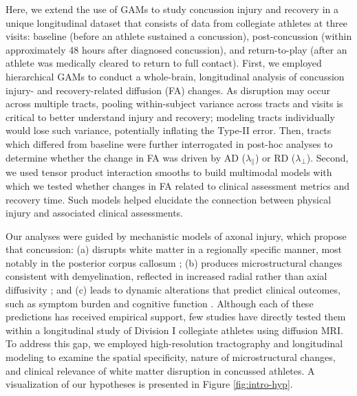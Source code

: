 \documentclass[12pt]{article}
\begin{document}
Here, we extend the use of GAMs to study concussion injury and recovery in a unique longitudinal dataset that consists of data from collegiate athletes at three visits: baseline (before an athlete sustained a concussion), post-concussion (within approximately 48 hours after diagnosed concussion), and return-to-play (after an athlete was medically cleared to return to full contact). First, we employed hierarchical GAMs to conduct a whole-brain, longitudinal analysis of concussion injury- and recovery-related diffusion (FA) changes. As disruption may occur across multiple tracts, pooling within-subject variance across tracts and visits is critical to better understand injury and recovery; modeling tracts individually would lose such variance, potentially inflating the Type-II error. Then, tracts which differed from baseline were further interrogated in post-hoc analyses to determine whether the change in FA was driven by AD ($\lambda_\parallel$) or RD ($\lambda_\perp$). Second, we used tensor product interaction smooths to build multimodal models with which we tested whether changes in FA related to clinical assessment metrics and recovery time. Such models helped elucidate the connection between physical injury and associated clinical assessments.

Our analyses were guided by mechanistic models of axonal injury, which propose that concussion: (a) disrupts white matter in a regionally specific manner, most notably in the posterior corpus callosum \parencite{jang2020DiagnosticProblemsDiffuse,johnson2013AxonalPathologyTraumatic,lindsey2023DiffusionWeightedImagingMild,meythaler2001CurrentConceptsDiffuse}; (b) produces microstructural changes consistent with demyelination, reflected in increased radial rather than axial diffusivity \parencite{mayer2017SpectrumMildTraumatic,borja2018DiffusionMRImaging}; and (c) leads to dynamic alterations that predict clinical outcomes, such as symptom burden and cognitive function \parencite{marmarou2007IMPACTDatabaseTraumatic,maas2013AdvancingCareTraumatic,schatz2013SensitivitySpecificityOnline}. Although each of these predictions has received empirical support, few studies have directly tested them within a longitudinal study of Division I collegiate athletes using diffusion MRI. To address this gap, we employed high-resolution tractography and longitudinal modeling to examine the spatial specificity, nature of microstructural changes, and clinical relevance of white matter disruption in concussed athletes. A visualization of our hypotheses is presented in Figure \ref{fig:intro-hyp}.
\end{document}
